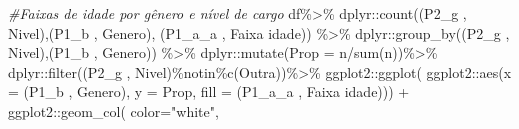 \documentclass[
]{article}
\newenvironment{Shaded}{\begin{snugshade}}{\end{snugshade}}
\newcommand{\AttributeTok}[1]{\textcolor[rgb]{0.77,0.63,0.00}{#1}}
\newcommand{\CommentTok}[1]{\textcolor[rgb]{0.56,0.35,0.01}{\textit{#1}}}
\newcommand{\FunctionTok}[1]{\textcolor[rgb]{0.00,0.00,0.00}{#1}}
\newcommand{\NormalTok}[1]{#1}
\newcommand{\SpecialCharTok}[1]{\textcolor[rgb]{0.00,0.00,0.00}{#1}}
\newcommand{\StringTok}[1]{\textcolor[rgb]{0.31,0.60,0.02}{#1}}
\begin{document}
\begin{Shaded}
\begin{Highlighting}[]
\CommentTok{\#Faixas de idade por gênero e nível de cargo}
\NormalTok{df}\SpecialCharTok{\%\textgreater{}\%}
\NormalTok{  dplyr}\SpecialCharTok{::}\FunctionTok{count}\NormalTok{(}\StringTok{\textasciigrave{}}\AttributeTok{(\textquotesingle{}P2\_g \textquotesingle{}, \textquotesingle{}Nivel\textquotesingle{})}\StringTok{\textasciigrave{}}\NormalTok{,}\StringTok{\textasciigrave{}}\AttributeTok{(\textquotesingle{}P1\_b \textquotesingle{}, \textquotesingle{}Genero\textquotesingle{})}\StringTok{\textasciigrave{}}\NormalTok{,}
               \StringTok{\textasciigrave{}}\AttributeTok{(\textquotesingle{}P1\_a\_a \textquotesingle{}, \textquotesingle{}Faixa idade\textquotesingle{})}\StringTok{\textasciigrave{}}\NormalTok{) }\SpecialCharTok{\%\textgreater{}\%}
\NormalTok{  dplyr}\SpecialCharTok{::}\FunctionTok{group\_by}\NormalTok{(}\StringTok{\textasciigrave{}}\AttributeTok{(\textquotesingle{}P2\_g \textquotesingle{}, \textquotesingle{}Nivel\textquotesingle{})}\StringTok{\textasciigrave{}}\NormalTok{,}\StringTok{\textasciigrave{}}\AttributeTok{(\textquotesingle{}P1\_b \textquotesingle{}, \textquotesingle{}Genero\textquotesingle{})}\StringTok{\textasciigrave{}}\NormalTok{) }\SpecialCharTok{\%\textgreater{}\%}
\NormalTok{  dplyr}\SpecialCharTok{::}\FunctionTok{mutate}\NormalTok{(}\AttributeTok{Prop =}\NormalTok{ n}\SpecialCharTok{/}\FunctionTok{sum}\NormalTok{(n))}\SpecialCharTok{\%\textgreater{}\%}
\NormalTok{  dplyr}\SpecialCharTok{::}\FunctionTok{filter}\NormalTok{(}\StringTok{\textasciigrave{}}\AttributeTok{(\textquotesingle{}P2\_g \textquotesingle{}, \textquotesingle{}Nivel\textquotesingle{})}\StringTok{\textasciigrave{}}\SpecialCharTok{\%notin\%}\FunctionTok{c}\NormalTok{(}\StringTok{\textquotesingle{}Outra\textquotesingle{}}\NormalTok{))}\SpecialCharTok{\%\textgreater{}\%}
\NormalTok{  ggplot2}\SpecialCharTok{::}\FunctionTok{ggplot}\NormalTok{(}
\NormalTok{    ggplot2}\SpecialCharTok{::}\FunctionTok{aes}\NormalTok{(}\AttributeTok{x =} \StringTok{\textasciigrave{}}\AttributeTok{(\textquotesingle{}P1\_b \textquotesingle{}, \textquotesingle{}Genero\textquotesingle{})}\StringTok{\textasciigrave{}}\NormalTok{, }\AttributeTok{y =}\NormalTok{ Prop,}
                 \AttributeTok{fill =} \StringTok{\textasciigrave{}}\AttributeTok{(\textquotesingle{}P1\_a\_a \textquotesingle{}, \textquotesingle{}Faixa idade\textquotesingle{})}\StringTok{\textasciigrave{}}\NormalTok{)) }\SpecialCharTok{+}
\NormalTok{  ggplot2}\SpecialCharTok{::}\FunctionTok{geom\_col}\NormalTok{( }\AttributeTok{color=}\StringTok{"white"}\NormalTok{,}

\end{Highlighting}
\end{Shaded}
\end{document}
